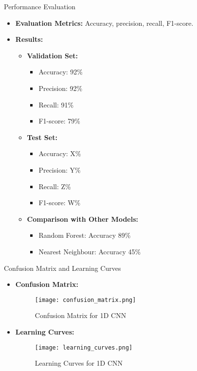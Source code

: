 \documentclass{beamer}
\begin{document}
\begin{frame}{Performance Evaluation}
  \begin{itemize}
    \item \textbf{Evaluation Metrics:} Accuracy, precision, recall, F1-score.
    \item \textbf{Results:}
      \begin{itemize}
        \item \textbf{Validation Set:}
          \begin{itemize}
            \item Accuracy: 92\%
            \item Precision: 92\%
            \item Recall: 91\%
            \item F1-score: 79\%
          \end{itemize}
        \item \textbf{Test Set:}
          \begin{itemize}
            \item Accuracy: X\%  %
            \item Precision: Y\%  %
            \item Recall: Z\%  %
            \item F1-score: W\%  %
          \end{itemize}
        \item \textbf{Comparison with Other Models:}
          \begin{itemize}
            \item Random Forest: Accuracy 89\%  %
            \item Nearest Neighbour: Accuracy 45\%  %
          \end{itemize}
      \end{itemize}
  \end{itemize}
\end{frame}

\begin{frame}{Confusion Matrix and Learning Curves}
  \begin{itemize}
    \item \textbf{Confusion Matrix:}
      \begin{figure}
        \centering
        \texttt{[image: confusion\_matrix.png]}
        \caption{Confusion Matrix for 1D CNN}
      \end{figure}
    \item \textbf{Learning Curves:}
      \begin{figure}
        \centering
        \texttt{[image: learning\_curves.png]}
        \caption{Learning Curves for 1D CNN}
      \end{figure}
  \end{itemize}
\end{frame}
\end{document}
